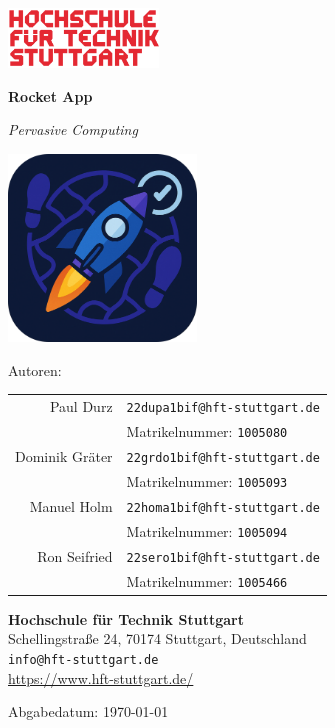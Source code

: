 \documentclass[11pt,a4paper]{article}
\newcommand{\email}[1]{\texttt{#1}}
\newcommand{\id}[1]{\texttt{#1}}
\begin{document}
\begin{titlepage}
    \begin{flushright}
        \includegraphics[width=4cm]{images/Logo-HFT-Stuttgart.png}
    \end{flushright}
    \vspace*{0.5cm}

    \begin{center}
        {\Huge \textbf{Rocket App} \par}
        \vspace{0.3cm}
        {\LARGE \textit{Pervasive Computing} \par}
        \vspace{1.5cm}
        \includegraphics[width=5cm]{images/AppIcon.png}
        \vspace{1.5cm}

        {\Large Autoren: \par}
        \vspace{0.3cm}
        \begin{tabular}{rl}
            Paul Durz      & \email{22dupa1bif@hft-stuttgart.de} \\
                          & Matrikelnummer: \id{1005080} \\
            Dominik Gräter & \email{22grdo1bif@hft-stuttgart.de} \\
                          & Matrikelnummer: \id{1005093} \\
            Manuel Holm    & \email{22homa1bif@hft-stuttgart.de} \\
                          & Matrikelnummer: \id{1005094} \\
            Ron Seifried   & \email{22sero1bif@hft-stuttgart.de} \\
                          & Matrikelnummer: \id{1005466} \\
        \end{tabular}
        \vspace{1.5cm}

        \textbf{Hochschule für Technik Stuttgart} \\
        Schellingstraße 24, 70174 Stuttgart, Deutschland \\
        \email{info@hft-stuttgart.de} \\
        \url{https://www.hft-stuttgart.de/}

        \vfill
        \large Abgabedatum: \today \\
    \end{center}
\end{titlepage}
\end{document}
